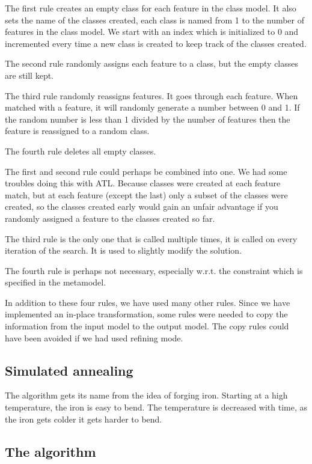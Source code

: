 \documentclass[a4paper]{article}
\begin{document}
The first rule creates an empty class for each feature in the class model.
It also sets the name of the classes created, each class is named from 1 to the number of features in the class model.
We start with an index which is initialized to 0 and incremented every time a new class is created to keep track of the classes created.

The second rule randomly assigns each feature to a class, but the empty classes are still kept.

The third rule randomly reassigns features.
It goes through each feature.
When matched with a feature, it will randomly generate a number between 0 and 1.
If the random number is less than 1 divided by the number of features then the feature is reassigned to a random class.

The fourth rule deletes all empty classes.

The first and second rule could perhaps be combined into one.
We had some troubles doing this with ATL.
Because classes were created at each feature match, but at each feature (except the last) only a subset of the classes were created, so the classes created early would gain an unfair advantage if you randomly assigned a feature to the classes created so far.

The third rule is the only one that is called multiple times, it is called on every iteration of the search.
It is used to slightly modify the solution.

The fourth rule is perhaps not necessary, especially w.r.t. the constraint which is specified in the metamodel.

In addition to these four rules, we have used many other rules.
Since we have implemented an in-place transformation, some rules were needed to copy the information from the input model to the output model.
The copy rules could have been avoided if we had used refining mode.

\subsection{Simulated annealing}

The algorithm gets its name from the idea of forging iron.
Starting at a high temperature, the iron is easy to bend.
The temperature is decreased with time, as the iron gets colder it gets harder to bend.


\subsection{The algorithm}
\end{document}

